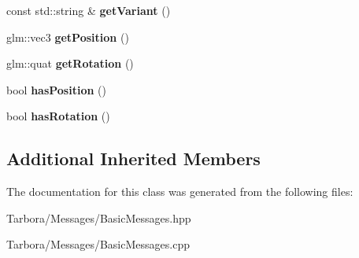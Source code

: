\begin{DoxyCompactItemize}
\mbox{\label{classTarbora_1_1Message_1_1CreateActor_aa4ae5b20c334a946846bfbbf3dabde96}} 
const std\+::string \& {\bfseries get\+Variant} ()
\item 
\mbox{\label{classTarbora_1_1Message_1_1CreateActor_ada9e16bb08abadaf245c4993a8a588dc}} 
glm\+::vec3 {\bfseries get\+Position} ()
\item 
\mbox{\label{classTarbora_1_1Message_1_1CreateActor_af7068fa52473ad3592038af0f8492905}} 
glm\+::quat {\bfseries get\+Rotation} ()
\item 
\mbox{\label{classTarbora_1_1Message_1_1CreateActor_acf1b3e888fd715357d59e697e0d25caa}} 
bool {\bfseries has\+Position} ()
\item 
\mbox{\label{classTarbora_1_1Message_1_1CreateActor_a073fd44432d7db362801497af7af31d7}} 
bool {\bfseries has\+Rotation} ()
\end{DoxyCompactItemize}
\subsection*{Additional Inherited Members}


The documentation for this class was generated from the following files\+:\begin{DoxyCompactItemize}
\item 
Tarbora/\+Messages/Basic\+Messages.\+hpp\item 
Tarbora/\+Messages/Basic\+Messages.\+cpp\end{DoxyCompactItemize}
